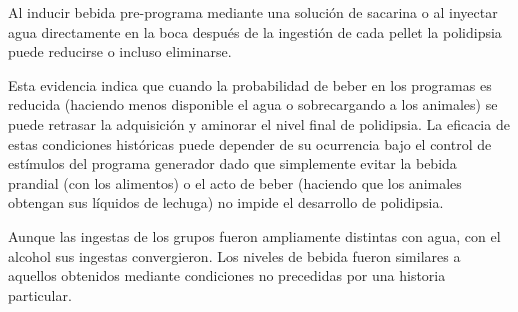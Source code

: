 \documentclass[a4paper,12pt]{article}
\begin{document}
Al inducir bebida pre-programa mediante una solución de sacarina o al inyectar agua directamente en la boca después de la ingestión de cada pellet la polidipsia puede reducirse o incluso eliminarse.

Esta evidencia indica que cuando la probabilidad de beber en los programas es reducida (haciendo menos disponible el agua o sobrecargando a los animales) se puede retrasar la adquisición y aminorar el nivel final de polidipsia. La eficacia de estas condiciones históricas puede depender de su ocurrencia bajo el control de estímulos del programa generador dado que simplemente evitar la bebida prandial (con los alimentos) o el acto de beber (haciendo que los animales obtengan sus líquidos de lechuga) no impide el desarrollo de polidipsia. 

Aunque las ingestas de los grupos fueron ampliamente distintas con agua, con el alcohol sus ingestas convergieron. Los niveles de bebida fueron similares a aquellos obtenidos mediante condiciones no precedidas por una historia particular.
\end{document}
